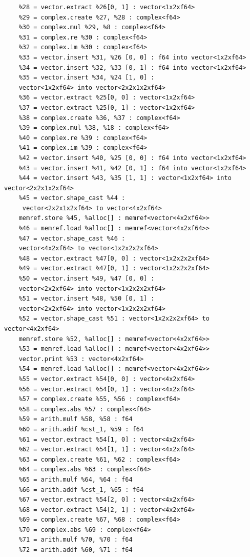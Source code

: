 \begin{verbatim}
    %28 = vector.extract %26[0, 1] : vector<1x2xf64>
    %29 = complex.create %27, %28 : complex<f64>
    %30 = complex.mul %29, %8 : complex<f64>
    %31 = complex.re %30 : complex<f64>
    %32 = complex.im %30 : complex<f64>
    %33 = vector.insert %31, %26 [0, 0] : f64 into vector<1x2xf64>
    %34 = vector.insert %32, %33 [0, 1] : f64 into vector<1x2xf64>
    %35 = vector.insert %34, %24 [1, 0] : 
    vector<1x2xf64> into vector<2x2x1x2xf64>
    %36 = vector.extract %25[0, 0] : vector<1x2xf64>
    %37 = vector.extract %25[0, 1] : vector<1x2xf64>
    %38 = complex.create %36, %37 : complex<f64>
    %39 = complex.mul %38, %18 : complex<f64>
    %40 = complex.re %39 : complex<f64>
    %41 = complex.im %39 : complex<f64>
    %42 = vector.insert %40, %25 [0, 0] : f64 into vector<1x2xf64>
    %43 = vector.insert %41, %42 [0, 1] : f64 into vector<1x2xf64>
    %44 = vector.insert %43, %35 [1, 1] : vector<1x2xf64> into vector<2x2x1x2xf64>
    %45 = vector.shape_cast %44 :
     vector<2x2x1x2xf64> to vector<4x2xf64>
    memref.store %45, %alloc[] : memref<vector<4x2xf64>>
    %46 = memref.load %alloc[] : memref<vector<4x2xf64>>
    %47 = vector.shape_cast %46 : 
    vector<4x2xf64> to vector<1x2x2x2xf64>
    %48 = vector.extract %47[0, 0] : vector<1x2x2x2xf64>
    %49 = vector.extract %47[0, 1] : vector<1x2x2x2xf64>
    %50 = vector.insert %49, %47 [0, 0] : 
    vector<2x2xf64> into vector<1x2x2x2xf64>
    %51 = vector.insert %48, %50 [0, 1] : 
    vector<2x2xf64> into vector<1x2x2x2xf64>
    %52 = vector.shape_cast %51 : vector<1x2x2x2xf64> to vector<4x2xf64>
    memref.store %52, %alloc[] : memref<vector<4x2xf64>>
    %53 = memref.load %alloc[] : memref<vector<4x2xf64>>
    vector.print %53 : vector<4x2xf64>
    %54 = memref.load %alloc[] : memref<vector<4x2xf64>>
    %55 = vector.extract %54[0, 0] : vector<4x2xf64>
    %56 = vector.extract %54[0, 1] : vector<4x2xf64>
    %57 = complex.create %55, %56 : complex<f64>
    %58 = complex.abs %57 : complex<f64>
    %59 = arith.mulf %58, %58 : f64
    %60 = arith.addf %cst_1, %59 : f64
    %61 = vector.extract %54[1, 0] : vector<4x2xf64>
    %62 = vector.extract %54[1, 1] : vector<4x2xf64>
    %63 = complex.create %61, %62 : complex<f64>
    %64 = complex.abs %63 : complex<f64>
    %65 = arith.mulf %64, %64 : f64
    %66 = arith.addf %cst_1, %65 : f64
    %67 = vector.extract %54[2, 0] : vector<4x2xf64>
    %68 = vector.extract %54[2, 1] : vector<4x2xf64>
    %69 = complex.create %67, %68 : complex<f64>
    %70 = complex.abs %69 : complex<f64>
    %71 = arith.mulf %70, %70 : f64
    %72 = arith.addf %60, %71 : f64

\end{verbatim}
